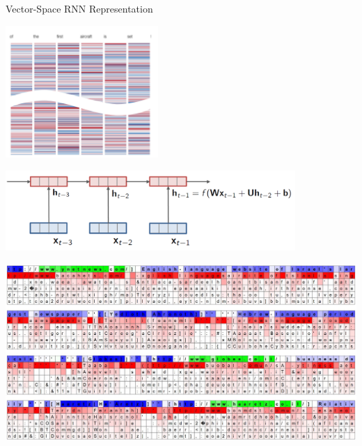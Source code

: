 \documentclass{beamer}
\newcommand{\Cite}[1]{{\footnotesize \citep{#1}}}
\begin{document}



\begin{frame}
  \centerline{Vector-Space RNN Representation}
  \begin{center}
    \includegraphics[height=5cm]{lstmrep}
  \begin{center}
    \includegraphics[width=11cm]{rnn}
  \end{center}


  \end{center}
\end{frame}


\begin{frame}
  \begin{center}
    \includegraphics[width=\textwidth]{lstm1}

     \Cite{karpathy2015visualizing}
  \end{center}
\end{frame}
\end{document}
